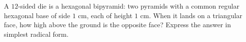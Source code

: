 A $12$-sided die is a hexagonal bipyramid: two pyramids with a common regular hexagonal base of side $1$ cm, each of height $1$ cm. When it lands on a triangular face, how high above the ground is the opposite face? Express the answer in simplest radical form.
